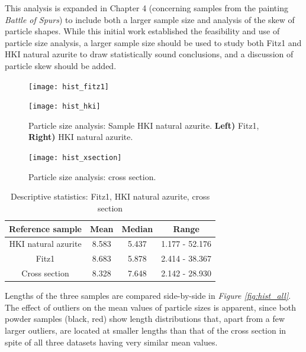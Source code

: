 This analysis is expanded in Chapter 4 (concerning samples from the painting \textit{Battle of Spurs}) to include both a larger sample size and analysis of the skew of particle shapes. While this initial work established the feasibility and use of particle size analysis, a larger sample size should be used to study both Fitz1 and HKI natural azurite to draw statistically sound conclusions, and a discussion of particle skew should be added.

\begin{figure}[H]
\centering
\begin{minipage}{.45\textwidth}
  \centering
  \texttt{[image: hist\_fitz1]}
\end{minipage}
\begin{minipage}{.45\textwidth}
  \centering
  \texttt{[image: hist\_hki]}
\end{minipage}
\caption[Particle size analysis: HKI natural azurite, Fitz1]{Particle size analysis: Sample HKI natural azurite. \textbf{Left)} Fitz1, \textbf{Right)} HKI natural azurite.}
\label{fig:histogram_length}
\end{figure}

\begin{figure}[H]
\centering
  \texttt{[image: hist\_xsection]}
\caption[Particle size analysis: cross section]{Particle size analysis: cross section.} 
\label{fig:hist_xsec}
\end{figure}

\begin{table}[H]
\caption{Descriptive statistics: Fitz1, HKI natural azurite, cross section}
\centering
\label{table:r_stats}
\begin{tabular}{c c c c}
\toprule
Reference sample & Mean & Median & Range \\
\midrule
HKI natural azurite & 8.583 & 5.437 & 1.177 - 52.176 \\
Fitz1 & 8.683 & 5.878 & 2.414 - 38.367 \\
Cross section & 8.328 & 7.648 & 2.142 - 28.930 \\
\bottomrule
\end{tabular}
\end{table}

Lengths of the three samples are compared side-by-side in \textit{Figure \ref{fig:hist_all}}. The effect of outliers on the mean values of particle sizes is apparent, since both powder samples (black, red) show length distributions that, apart from a few larger outliers, are located at smaller lengths than that of the cross section in spite of all three datasets having very similar mean values. 

